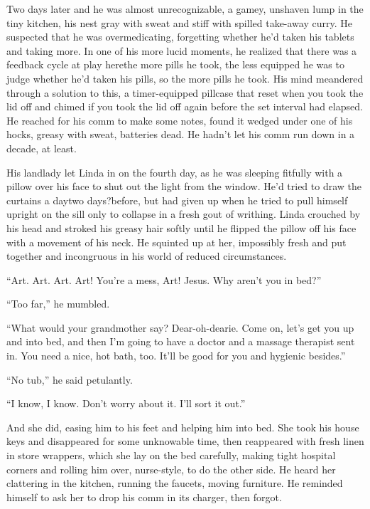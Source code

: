Two days later and he was almost unrecognizable, a gamey, unshaven
lump in the tiny kitchen, his nest gray with sweat and stiff with
spilled take-away curry. He suspected that he was overmedicating,
forgetting whether he’d taken his tablets and taking more. In one
of his more lucid moments, he realized that there was a feedback
cycle at play here{\dash}the more pills he took, the less equipped he was
to judge whether he’d taken his pills, so the more pills he took.
His mind meandered through a solution to this, a timer-equipped
pillcase that reset when you took the lid off and chimed if you
took the lid off again before the set interval had elapsed. He
reached for his comm to make some notes, found it wedged under one
of his hocks, greasy with sweat, batteries dead. He hadn’t let his
comm run down in a decade, at least.

His landlady let Linda in on the fourth day, as he was sleeping
fitfully with a pillow over his face to shut out the light from the
window. He’d tried to draw the curtains a day{\dash}two days?{\dash}be\-fore, but
had given up when he tried to pull himself upright on the sill only
to collapse in a fresh gout of writhing. Linda crouched by his head
and stroked his greasy hair softly until he flipped the pillow off
his face with a movement of his neck. He squinted up at her,
impossibly fresh and put together and incongruous in his world of
reduced circumstances.

“Art. Art. Art. Art! You’re a mess, Art! Jesus. Why aren’t you in
bed?”

“Too far,” he mumbled.

“What would your grandmother say? Dear-oh-dearie. Come on, let’s
get you up and into bed, and then I’m going to have a doctor and a
massage therapist sent in. You need a nice, hot bath, too. It’ll be
good for you and hygienic besides.”

“No tub,” he said petulantly.

“I know, I know. Don’t worry about it. I’ll sort it out.”

And she did, easing him to his feet and helping him into bed. She
took his house keys and disappeared for some unknowable time, then
reappeared with fresh linen in store wrappers, which she lay on the
bed carefully, making tight hospital corners and rolling him over,
nurse-style, to do the other side. He heard her clattering in the
kitchen, running the faucets, moving furniture. He reminded himself
to ask her to drop his comm in its charger, then forgot.

